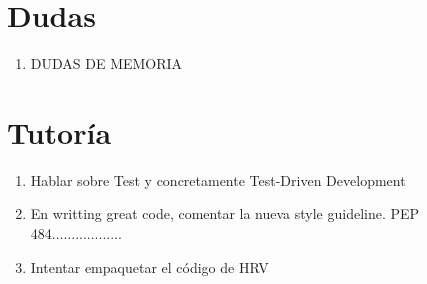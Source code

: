 \chapter*{Dudas}
\begin{enumerate}
    \item DUDAS DE MEMORIA
\end{enumerate}
\chapter*{Tutoría}
\begin{enumerate}
    \item Hablar sobre Test y concretamente Test-Driven Development
    \item En writting great code, comentar la nueva style guideline. PEP 484..................
    \item Intentar empaquetar el código de HRV
\end{enumerate}
